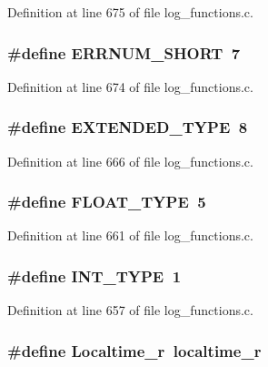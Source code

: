 Definition at line 675 of file log\_\-functions.c.
\subsubsection[{ERRNUM\_\-SHORT}]{\setlength{\rightskip}{0pt plus 5cm}\#define ERRNUM\_\-SHORT~7}\label{log__functions_8c_a5951c7f2dca969a40fb17a1d978ec3ce}


Definition at line 674 of file log\_\-functions.c.
\subsubsection[{EXTENDED\_\-TYPE}]{\setlength{\rightskip}{0pt plus 5cm}\#define EXTENDED\_\-TYPE~8}\label{log__functions_8c_aad8bc0a9348a8a65a745614ba6b09b8d}


Definition at line 666 of file log\_\-functions.c.
\subsubsection[{FLOAT\_\-TYPE}]{\setlength{\rightskip}{0pt plus 5cm}\#define FLOAT\_\-TYPE~5}\label{log__functions_8c_a41cf4177f569cb6b87ec5c90c0165769}


Definition at line 661 of file log\_\-functions.c.
\subsubsection[{INT\_\-TYPE}]{\setlength{\rightskip}{0pt plus 5cm}\#define INT\_\-TYPE~1}\label{log__functions_8c_ac29eb1421065a6544048e884e95a61c6}


Definition at line 657 of file log\_\-functions.c.
\subsubsection[{Localtime\_\-r}]{\setlength{\rightskip}{0pt plus 5cm}\#define Localtime\_\-r~localtime\_\-r}\label{log__functions_8c_a61fa1aca88aec5370822f995ded637b3}


